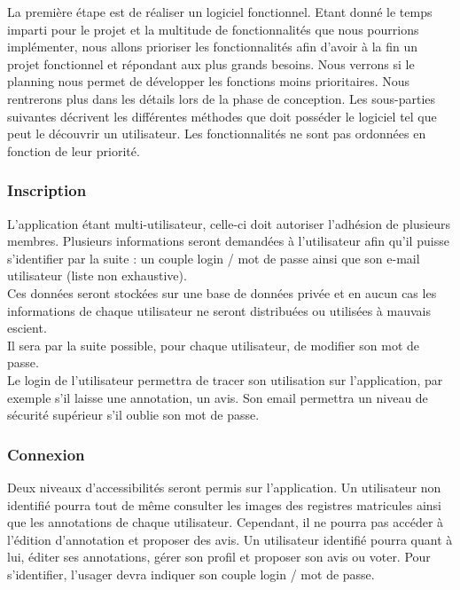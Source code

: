 \documentclass[a4paper]{article}
\begin{document}
	La premi\`ere \'etape est de r\'ealiser un logiciel fonctionnel. Etant donn\'e le temps imparti pour le projet et la multitude de fonctionnalit\'es que nous pourrions impl\'ementer, nous allons prioriser les fonctionnalit\'es afin d'avoir \`a la fin un projet fonctionnel et r\'epondant aux plus grands besoins. Nous verrons si le planning nous permet de d\'evelopper les fonctions moins prioritaires. Nous rentrerons plus dans les d\'etails lors de la phase de conception. Les sous-parties suivantes d\'ecrivent les diff\'erentes m\'ethodes que doit poss\'eder le logiciel tel que peut le d\'ecouvrir un utilisateur. Les fonctionnalit\'es ne sont pas ordonn\'ees en fonction de leur priorit\'e. 
    
\subsubsection{Inscription}


	L'application \'etant multi-utilisateur, celle-ci doit autoriser l'adh\'esion de plusieurs membres. Plusieurs informations seront demand\'ees \`a l'utilisateur afin qu'il puisse s'identifier par la suite : un couple login / mot de passe ainsi que son e-mail utilisateur (liste non exhaustive).\\

	Ces donn\'ees seront stock\'ees sur une base de donn\'ees priv\'ee et en aucun cas les informations de chaque utilisateur ne seront distribu\'ees ou utilis\'ees \`a mauvais escient. \\
    
    Il sera par la suite possible, pour chaque utilisateur, de modifier son mot de passe.\\

	Le login de l'utilisateur permettra de tracer son utilisation sur l'application, par exemple s'il laisse une annotation, un avis. Son email permettra un niveau de s\'ecurit\'e sup\'erieur s'il oublie son mot de passe.
    
\subsubsection{Connexion}

	Deux niveaux d'accessibilit\'es seront permis sur l'application. Un utilisateur non identifi\'e pourra tout de m\^eme consulter les images des registres matricules ainsi que les annotations de chaque utilisateur. Cependant, il ne pourra pas acc\'eder \`a l'\'edition d'annotation et proposer des avis. 
Un utilisateur identifi\'e pourra quant \`a lui, \'editer ses annotations, g\'erer son profil et proposer son avis ou voter.
Pour s'identifier, l'usager devra indiquer son couple login / mot de passe.
\end{document}
